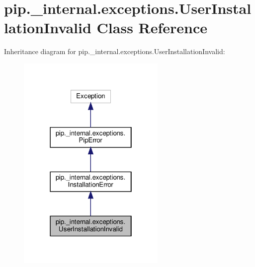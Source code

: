 \hypertarget{classpip_1_1__internal_1_1exceptions_1_1UserInstallationInvalid}{}\section{pip.\+\_\+internal.\+exceptions.\+User\+Installation\+Invalid Class Reference}
\label{classpip_1_1__internal_1_1exceptions_1_1UserInstallationInvalid}


Inheritance diagram for pip.\+\_\+internal.\+exceptions.\+User\+Installation\+Invalid\+:
\nopagebreak
\begin{figure}[H]
\begin{center}
\leavevmode
\includegraphics[width=202pt]{classpip_1_1__internal_1_1exceptions_1_1UserInstallationInvalid__inherit__graph}
\end{center}
\end{figure}


